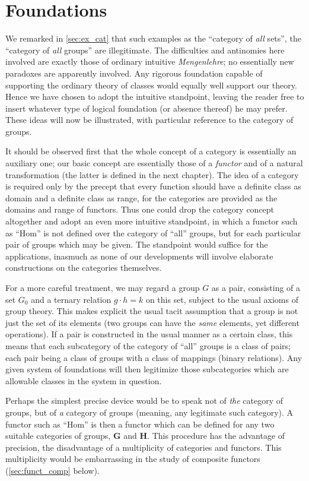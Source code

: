 \documentclass[11pt,a4paper]{report}
\begin{document}
\section{Foundations}\label{sec:found}
We remarked in \cref{sec:ex_cat} that such examples as the ``category of \emph{all} sets'', the ``category
of \emph{all} groups'' are illegitimate. The difficulties and antinomies here involved are exactly those of
ordinary intuitive \textsl{\foreignlanguage{german}{Mengenlehre}}; no essentially new paradoxes are apparently
involved. Any rigorous foundation capable of supporting the ordinary theory of classes would equally well 
support our theory. Hence we have chosen to adopt the intuitive standpoint, leaving the reader free to insert
whatever type of logical foundation (or absence thereof) he may prefer. These ideas will now be illustrated,
with particular reference to the category of groups.

It should be observed first that the whole concept of a category is essentially an auxiliary one; our basic
concept are essentially those of a \emph{functor} and of a natural transformation (the latter is defined
in the next chapter). The idea of a category is required only by the precept that every function should have
a definite class as domain and a definite class as range, for the categories are provided as the domains and
range of functors. Thus one could drop the category concept altogether and adopt an even more intuitive 
standpoint, in which a functor such as ``Hom'' is not defined over the category of ``all'' groups, but for
each particular pair of groups which may be given. The standpoint would suffice for the applications, inasmuch
as none of our developments will involve elaborate constructions on the categories themselves.

For a more careful treatment, we may regard a group $G$ as a pair, consisting of a set $G_0$ and a ternary
relation $g\cdot h = k$ on this set, subject to the usual axioms of group theory. This makes explicit the
usual tacit assumption that a group is not just the set of its elements (two groups can have the \emph{same}
elements, yet different operations). If a pair is constructed in the usual manner as a certain class, this
means that each subcategory of the category of ``all'' groups is a class of pairs; each pair being a class
of groups with a class of mappings (binary relations). Any given system of foundations will then legitimize
those subcategories which are allowable classes in the system in question.

Perhaps the simplest precise device would be to speak not of \emph{the} category of groups, but of \emph{a}
category of groups (meaning, any legitimate such category). A functor such as ``Hom'' is then a functor which
can be defined for any two suitable categories of groups, $\mathbf{G}$ and $\mathbf{H}$. This procedure
has the advantage of precision, the disadvantage of a multiplicity of categories and functors. This multiplicity
would be embarrassing in the study of composite functors (\cref{sec:funct_comp} below).
\end{document}
